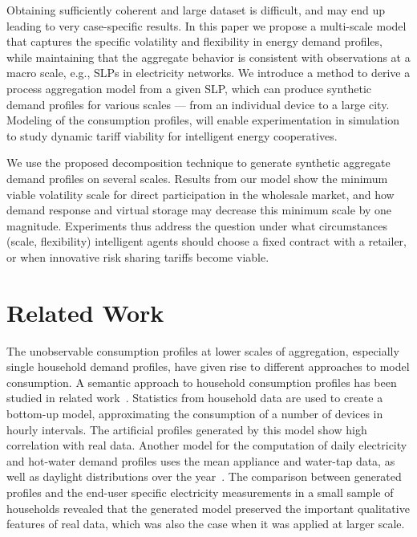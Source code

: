 \documentclass[conference]{IEEEtran}
\begin{document}
Obtaining sufficiently coherent and large dataset is difficult, and may end up leading to very case-specific results. In this paper we propose a multi-scale model that captures the specific volatility and flexibility in energy demand profiles, while maintaining that the aggregate behavior is consistent with observations at a macro scale, e.g., SLPs in electricity networks. We introduce a method to derive a process aggregation model from a given SLP, which can produce synthetic demand profiles for various scales --- from an individual device to a large city. Modeling of the consumption profiles, will enable experimentation in simulation to study dynamic tariff viability for intelligent energy cooperatives.

We use the proposed decomposition technique to generate synthetic aggregate demand profiles on several scales. Results from our model show the minimum viable volatility scale for direct participation in the wholesale market, and how demand response and virtual storage may decrease this minimum scale by one magnitude. Experiments thus address the question under what circumstances (scale, flexibility) intelligent agents should choose a fixed contract with a retailer, or when innovative risk sharing tariffs become viable.



\section{Related Work}
\label{sec:Related}
The unobservable consumption profiles at lower scales of aggregation, especially single household demand profiles, have given rise to different approaches to model consumption. A semantic approach to household consumption profiles has been studied in related work~\cite{paatero2006model}. Statistics from household data are used to create a bottom-up model, approximating the consumption of a number of devices in hourly intervals. The artificial profiles generated by this model show high correlation with real data.
Another model for the computation of daily electricity and hot-water demand profiles uses the mean appliance and water-tap data, as well as daylight distributions over the year~\cite{widen2009constructing}. The comparison between generated profiles and the end-user specific electricity measurements in a small sample of households revealed that the generated model preserved the important qualitative features of real data, which was also the case when it was applied at larger scale.
\end{document}
